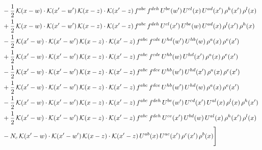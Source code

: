 \documentclass[9pt]{article}
\numberwithin{equation}{section}
\begin{document}
\begin{align}
& -\frac{1}{2}\,\mathcal{K}(x-w)\cdot\mathcal{K}(x'-w')\,\mathcal{K}(x-z)\cdot\mathcal{K}(x'-z)\,f^{abc}\,f^{deh}\,U^{be}(w')\,U^{cl}(x)\,U^{ad}(x')\,\rho^{h}(x')\,\rho^{l}(x)\notag\\
& +\frac{1}{2}\,\mathcal{K}(x-w)\cdot\mathcal{K}(x'-w')\,\mathcal{K}(x-z)\cdot\mathcal{K}(x'-z)\,f^{abc}\,f^{deh}\,U^{cl}(x')\,U^{be}(w)\,U^{ad}(x)\,\rho^{l}(x')\,\rho^{h}(x)\notag\\
& -\frac{1}{2}\,\mathcal{K}(x'-w)\cdot\mathcal{K}(x'-w')\,\mathcal{K}(x-z)\cdot\mathcal{K}(x'-z)\,f^{abc}\,f^{cde}\,U^{hd}(w')\,U^{hb}(w)\,\rho^{a}(x)\,\rho^{e}(x')\notag\\
& +\frac{1}{2}\,\mathcal{K}(x'-w)\cdot\mathcal{K}(x'-w')\,\mathcal{K}(x-z)\cdot\mathcal{K}(x'-z)\,f^{abc}\,f^{cde}\,U^{hb}(w)\,U^{hd}(x')\,\rho^{a}(x)\,\rho^{e}(x')\notag\\
& -\frac{1}{2}\,\mathcal{K}(x'-w)\cdot\mathcal{K}(x'-w')\,\mathcal{K}(x-z)\cdot\mathcal{K}(x'-z)\,f^{abc}\,f^{dce}\,U^{hb}(w')\,U^{hd}(x')\,\rho^{a}(x)\,\rho^{e}(x')\notag\\
& +\frac{1}{2}\,\mathcal{K}(x'-w)\cdot\mathcal{K}(x'-w')\,\mathcal{K}(x-z)\cdot\mathcal{K}(x'-z)\,f^{abc}\,f^{dce}\,U^{hb}(w')\,U^{hd}(w)\,\rho^{a}(x)\,\rho^{e}(x')\notag\\
& -\frac{1}{2}\,\mathcal{K}(x'-w)\cdot\mathcal{K}(x'-w')\,\mathcal{K}(x-z)\cdot\mathcal{K}(x'-z)\,f^{abc}\,f^{deh}\,U^{be}(w')\,U^{cd}(x')\,U^{al}(x)\,\rho^{l}(x)\,\rho^{h}(x')\notag\\
& +\frac{1}{2}\,\mathcal{K}(x'-w)\cdot\mathcal{K}(x'-w')\,\mathcal{K}(x-z)\cdot\mathcal{K}(x'-z)\,f^{abc}\,f^{deh}\,U^{ce}(x')\,U^{bd}(w)\,U^{al}(x)\,\rho^{h}(x')\,\rho^{l}(x)\notag\\
& -N_{c}\,\mathcal{K}(x'-w)\cdot\mathcal{K}(x'-w')\,\mathcal{K}(x-z)\cdot\mathcal{K}(x'-z)\,U^{ab}(x)\,U^{ac}(x')\,\rho^{c}(x')\,\rho^{b}(x)\Bigg]
\end{align}
\end{document}
